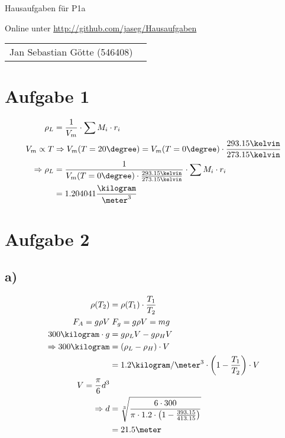 \documentclass[12pt,a4paper,notitlepage]{article}
\newcommand{\aufgabe}[1]{\section*{\setcounter{section}{#1}Aufgabe #1}}
\begin{document}
\begin{center}
\Large Hausaufgaben für P1a

\normalsize Online unter \url{http://github.com/jaseg/Hausaufgaben}
\end{center}
\begin{tabularx}{\textwidth}{Xr}
Jan Sebastian Götte (546408)
\end{tabularx}
\aufgabe{1}
\begin{align}
\rho_L &= \frac{1}{V_m}\cdot\sum M_i\cdot r_i\\
V_m \propto T &\Rightarrow V_m(T=20\degree) = V_m(T=0\degree)\cdot\frac{293.15\kelvin}{273.15\kelvin}\\
\Rightarrow \rho_L &= \frac{1}{V_m(T=0\degree)\cdot\frac{293.15\kelvin}{273.15\kelvin}}\cdot\sum M_i\cdot r_i\\
&= 1.204041\frac{\kilogram}{\meter^3}
\end{align}
\aufgabe{2}
\subsection*{a)}
\begin{align}
\rho(T_2)&=\rho(T_1)\cdot\frac{T_1}{T_2}\\
F_A=g\rho V&\;F_g=g\rho V=mg\\
300\kilogram\cdot g&=g\rho_LV-g\rho_HV\\
\Rightarrow 300\kilogram&=(\rho_L-\rho_H)\cdot V\\
&=1.2\kilogram/\meter^3\cdot\left(1-\frac{T_1}{T_2}\right)\cdot V\\
V=\frac{\pi}{6}d^3\\
\Rightarrow d&=\sqrt[3]{\frac{6\cdot 300}{\pi\cdot 1.2\cdot\left(1-\frac{393.15}{413.15}\right)}}\\
&=21.5\meter
\end{align}
\end{document}
